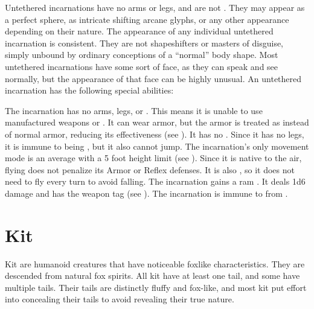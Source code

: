   Untethered incarnations have no arms or legs, and are not .
  They may appear as a perfect sphere, as intricate shifting arcane glyphs, or any other appearance depending on their nature.
  The appearance of any individual untethered incarnation is consistent.
  They are not shapeshifters or masters of disguise, simply unbound by ordinary conceptions of a ``normal'' body shape.
  Most untethered incarnations have some sort of face, as they can speak and see normally, but the appearance of that face can be highly unusual.
  An untethered incarnation has the following special abilities:
  \begin{raggeditemize}
     The incarnation has no arms, legs, or .
      This means it is unable to use manufactured weapons or .
      It can wear armor, but the armor is treated as  instead of normal armor, reducing its effectiveness (see ).
      It has no .
      Since it has no legs, it is immune to being \prone, but it also cannot jump.
     The incarnation's only movement mode is an average  with a 5 foot height limit (see ).
      Since it is native to the air, flying does not penalize its Armor or Reflex defenses.
      It is also , so it does not need to fly every turn to avoid falling.
     The incarnation gains a ram .
      It deals 1d6 damage and has the  weapon tag (see ).
     The incarnation is immune to  from .
  \end{raggeditemize}



\section{Kit}

  Kit are humanoid creatures that have noticeable foxlike characteristics.
  They are descended from natural fox spirits.
  All kit have at least one tail, and some have multiple tails.
  Their tails are distinctly fluffy and fox-like, and most kit put effort into concealing their tails to avoid revealing their true nature.

